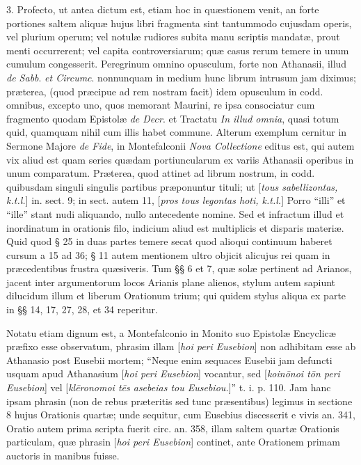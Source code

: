 3. Profecto, ut antea dictum est,
etiam hoc in quæstionem venit, an forte portiones saltem aliquæ
hujus libri fragmenta sint tantummodo cujusdam operis, vel plurium
operum; vel notulæ rudiores subita manu scriptis mandatæ, prout
menti occurrerent; vel capita controversiarum; quæ casus rerum temere
in unum cumulum congesserit. Peregrinum omnino opusculum, forte non
Athanasii, illud \emph{de Sabb}. \emph{et Circumc}. nonnunquam in
medium hunc librum intrusum jam diximus; præterea, (quod præcipue ad
rem nostram facit) idem opusculum in codd. omnibus, excepto uno, quos
memorant Maurini, re ipsa consociatur cum fragmento quodam Epistolæ \emph{de
Decr}. et Tractatu \emph{In illud omnia}, quasi totum quid,
quamquam nihil cum illis habet commune. Alterum exemplum cernitur in
Sermone Majore \emph{de Fide}, in Montefalconii \emph{Nova Collectione}
editus est, qui autem vix aliud est quam series quædam portiuncularum
ex variis Athanasii operibus in unum comparatum. Præterea, quod
attinet ad librum nostrum, in codd. quibusdam singuli singulis
partibus præponuntur tituli; ut [\emph{tous sabellizontas, k.t.l.}]
in. sect. 9; in sect. autem 11, [\emph{pros tous legontas hoti, k.t.l.}]
Porro ``illi'' et ``ille'' stant nudi aliquando, nullo antecedente nomine.
Sed et infractum illud et inordinatum in orationis filo, indicium
aliud est multiplicis et disparis materiæ. Quid quod § 25 in duas
partes temere secat quod alioqui continuum haberet cursum a 15 ad 36;
§ 11 autem mentionem ultro objicit alicujus rei quam in præcedentibus
frustra quæsiveris. Tum §§ 6 et 7, quæ solæ pertinent ad Arianos,
jacent inter argumentorum locos Arianis plane alienos, stylum autem
sapiunt dilucidum illum et liberum Orationum trium; qui quidem stylus
aliqua ex parte in §§ 14, 17, 27, 28, et 34 reperitur.

Notatu
etiam dignum est, a Montefalconio in Monito suo Epistolæ Encyclicæ
præfixo esse observatum, phrasim illam [\emph{hoi peri Eusebion}]
non adhibitam esse ab Athanasio post Eusebii mortem; ``Neque enim
sequaces Eusebii jam defuncti usquam apud Athanasium [\emph{hoi peri
Eusebion}] vocantur, sed [\emph{koin\={o}noi t\={o}n peri
Eusebion}] vel [\emph{kl\={e}ronomoi t\={e}s asebeias tou
Eusebiou.}]'' t. i. p. 110. Jam hanc ipsam phrasin (non de rebus præteritis
sed tunc præsentibus) legimus in sectione 8 hujus Orationis quartæ;
unde sequitur, cum Eusebius discesserit e vivis an. 341, Oratio autem
prima scripta fuerit circ. an. 358, illam saltem quartæ Orationis
particulam, quæ phrasin [\emph{hoi peri Eusebion}] continet, ante
Orationem primam auctoris in manibus fuisse.

